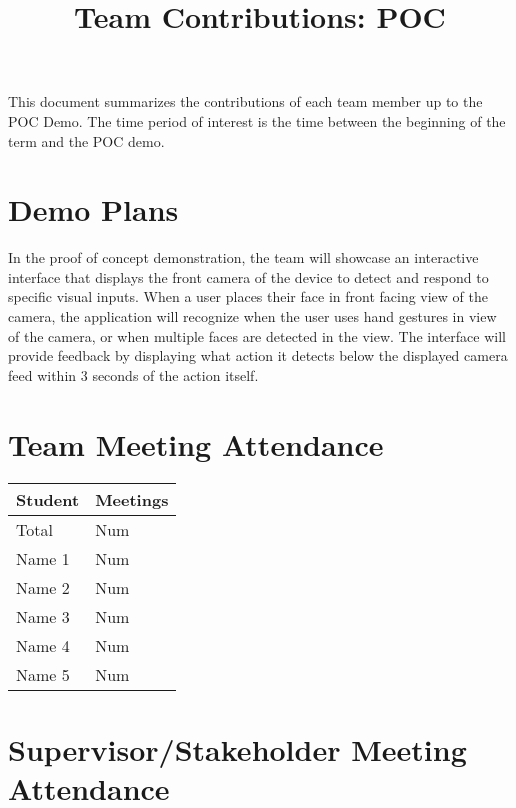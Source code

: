 \documentclass{article}
\title{Team Contributions: POC\\\progname}
\author{\authname}
\date{}
\begin{document}
\maketitle

This document summarizes the contributions of each team member up to the POC
Demo.  The time period of interest is the time between the beginning of the term
and the POC demo.

\section{Demo Plans}

In the proof of concept demonstration, the team will showcase an interactive interface that displays the front 
camera of the device to detect and respond to specific visual inputs. When a user places their face in front 
facing view of the camera, the application will recognize when the user uses hand gestures in view of the camera, 
or when multiple faces are detected in the view. The interface will provide feedback by displaying what action it 
detects below the displayed camera feed within 3 seconds of the action itself. 

\section{Team Meeting Attendance}


\begin{table}[H]
\centering
\begin{tabular}{ll}
\toprule
\textbf{Student} & \textbf{Meetings}\\
\midrule
Total & Num\\
Name 1 & Num\\
Name 2 & Num\\
Name 3 & Num\\
Name 4 & Num\\
Name 5 & Num\\
\bottomrule
\end{tabular}
\end{table}


\section{Supervisor/Stakeholder Meeting Attendance}
\end{document}
